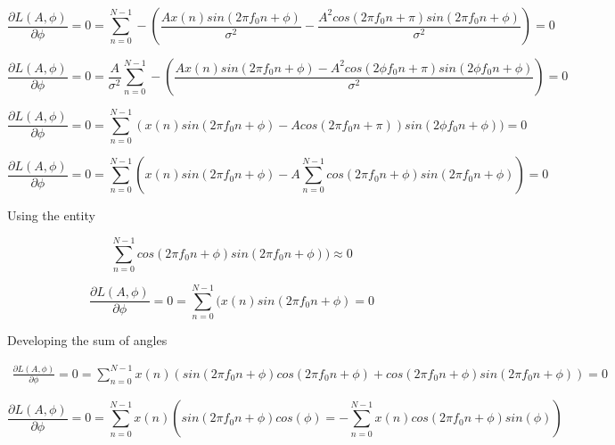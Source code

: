 \documentclass{report}
\begin{document}
\begin{equation}\label{key}
\frac{\partial L(A,\phi)}{\partial \phi} = 0 = \sum_{n=0}^{N-1} - (\frac{Ax(n)sin(2\pi f_0 n +\phi)}{\sigma^2}-\frac{A^2cos(2\pi f_0 n +\pi)sin(2\pi f_0 n +\phi)}{\sigma^2}) = 0
\end{equation}

\begin{equation}\label{key}
\frac{\partial L(A,\phi)}{\partial \phi} = 0 = \frac{A}{\sigma^2} \sum_{n=0}^{N-1} - (\frac{Ax(n)sin(2\pi f_0 n +\phi)-A^2cos(2\phi f_0 n +\pi)sin(2\phi f_0 n +\phi)}{\sigma^2}) = 0
\end{equation}


\begin{equation}\label{key}
\frac{\partial L(A,\phi)}{\partial \phi} = 0 = \sum_{n=0}^{N-1}(x(n)sin(2\pi f_0 n +\phi) - Acos(2\pi f_0 n +\pi))sin(2\phi f_0 n +\phi)) = 0
\end{equation}


\begin{equation}\label{key}
\frac{\partial L(A,\phi)}{\partial \phi} = 0 = \sum_{n=0}^{N-1}(x(n)sin(2\pi f_0 n +\phi) - A\sum_{n=0}^{N-1}cos(2\pi f_0 n +\phi)sin(2\pi f_0 n +\phi)) = 0
\end{equation}

Using the entity 

\begin{equation}\label{entitycossin}
\sum_{n=0}^{N-1}cos(2\pi f_0 n +\phi)sin(2\pi f_0 n +\phi)) \approx 0
\end{equation}

\begin{equation}\label{key}
\frac{\partial L(A,\phi)}{\partial \phi} = 0 = \sum_{n=0}^{N-1}(x(n)sin(2\pi f_0 n +\phi) = 0
\end{equation}

Developing the sum of angles

\begin{gather*} 
\frac{\partial L(A,\phi)}{\partial \phi} = 0 = \sum_{n=0}^{N-1}x(n)(sin(2\pi f_0 n +\phi)cos(2\pi f_0 n +\phi) + cos(2\pi f_0 n +\phi)sin(2\pi f_0 n +\phi)) = 0
\end{gather*}

\begin{equation}\label{key}
\frac{\partial L(A,\phi)}{\partial \phi} = 0 = \sum_{n=0}^{N-1}x(n)(sin(2\pi f_0 n +\phi)cos(\phi) = - \sum_{n=0}^{N-1}x(n)cos(2\pi f_0 n +\phi)sin(\phi)) 
\end{equation}
\end{document}
